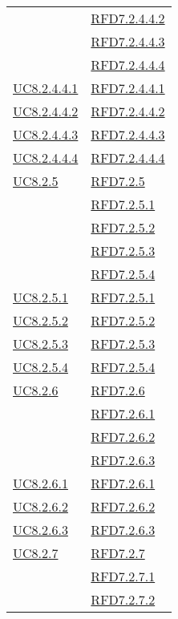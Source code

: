 \begin{longtable}{|>{\centering}m{5cm}|m{5cm}<{\centering}|}
& \hyperlink{RFD7.2.4.4.2}{RFD7.2.4.4.2}\\
& \hyperlink{RFD7.2.4.4.3}{RFD7.2.4.4.3}\\
& \hyperlink{RFD7.2.4.4.4}{RFD7.2.4.4.4}\\ \hline
\hyperref[UC8.2.4.4.1]{UC8.2.4.4.1} & \hyperlink{RFD7.2.4.4.1}{RFD7.2.4.4.1}\\ \hline
\hyperref[UC8.2.4.4.2]{UC8.2.4.4.2} & \hyperlink{RFD7.2.4.4.2}{RFD7.2.4.4.2}\\ \hline
\hyperref[UC8.2.4.4.3]{UC8.2.4.4.3} & \hyperlink{RFD7.2.4.4.3}{RFD7.2.4.4.3}\\ \hline
\hyperref[UC8.2.4.4.4]{UC8.2.4.4.4} & \hyperlink{RFD7.2.4.4.4}{RFD7.2.4.4.4}\\ \hline
\hyperref[UC8.2.5]{UC8.2.5} & \hyperlink{RFD7.2.5}{RFD7.2.5}\\
& \hyperlink{RFD7.2.5.1}{RFD7.2.5.1}\\
& \hyperlink{RFD7.2.5.2}{RFD7.2.5.2}\\
& \hyperlink{RFD7.2.5.3}{RFD7.2.5.3}\\
& \hyperlink{RFD7.2.5.4}{RFD7.2.5.4}\\ \hline
\hyperref[UC8.2.5.1]{UC8.2.5.1} & \hyperlink{RFD7.2.5.1}{RFD7.2.5.1}\\ \hline
\hyperref[UC8.2.5.2]{UC8.2.5.2} & \hyperlink{RFD7.2.5.2}{RFD7.2.5.2}\\ \hline
\hyperref[UC8.2.5.3]{UC8.2.5.3} & \hyperlink{RFD7.2.5.3}{RFD7.2.5.3}\\ \hline
\hyperref[UC8.2.5.4]{UC8.2.5.4} & \hyperlink{RFD7.2.5.4}{RFD7.2.5.4}\\ \hline
\hyperref[UC8.2.6]{UC8.2.6} & \hyperlink{RFD7.2.6}{RFD7.2.6}\\
& \hyperlink{RFD7.2.6.1}{RFD7.2.6.1}\\
& \hyperlink{RFD7.2.6.2}{RFD7.2.6.2}\\
& \hyperlink{RFD7.2.6.3}{RFD7.2.6.3}\\ \hline
\hyperref[UC8.2.6.1]{UC8.2.6.1} & \hyperlink{RFD7.2.6.1}{RFD7.2.6.1}\\ \hline
\hyperref[UC8.2.6.2]{UC8.2.6.2} & \hyperlink{RFD7.2.6.2}{RFD7.2.6.2}\\ \hline
\hyperref[UC8.2.6.3]{UC8.2.6.3} & \hyperlink{RFD7.2.6.3}{RFD7.2.6.3}\\ \hline
\hyperref[UC8.2.7]{UC8.2.7} & \hyperlink{RFD7.2.7}{RFD7.2.7}\\
& \hyperlink{RFD7.2.7.1}{RFD7.2.7.1}\\
& \hyperlink{RFD7.2.7.2}{RFD7.2.7.2}\\

\end{longtable}
